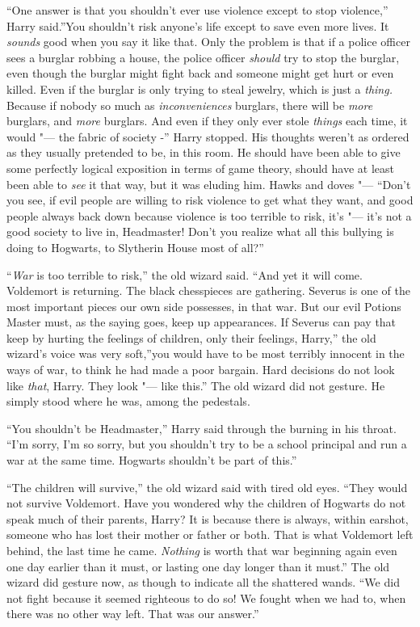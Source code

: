 ``One answer is that you shouldn't ever use violence except to stop
violence,'' Harry said.''You shouldn't risk anyone's life except to save
even more lives. It \emph{sounds} good when you say it like that. Only
the problem is that if a police officer sees a burglar robbing a house,
the police officer \emph{should} try to stop the burglar, even though
the burglar might fight back and someone might get hurt or even killed.
Even if the burglar is only trying to steal jewelry, which is just a
\emph{thing.} Because if nobody so much as \emph{inconveniences}
burglars, there will be \emph{more} burglars, and \emph{more} burglars.
And even if they only ever stole \emph{things} each time, it would "--- the
fabric of society -'' Harry stopped. His thoughts weren't as ordered as
they usually pretended to be, in this room. He should have been able to
give some perfectly logical exposition in terms of game theory, should
have at least been able to \emph{see} it that way, but it was eluding
him. Hawks and doves "--- ``Don't you see, if evil people are willing to
risk violence to get what they want, and good people always back down
because violence is too terrible to risk, it's "--- it's not a good society
to live in, Headmaster! Don't you realize what all this bullying is
doing to Hogwarts, to Slytherin House most of all?''

``\emph{War} is too terrible to risk,'' the old wizard said. ``And yet it
will come. Voldemort is returning. The black chesspieces are gathering.
Severus is one of the most important pieces our own side possesses, in
that war. But our evil Potions Master must, as the saying goes, keep up
appearances. If Severus can pay that keep by hurting the feelings of
children, only their feelings, Harry,'' the old wizard's voice was very
soft,''you would have to be most terribly innocent in the ways of war,
to think he had made a poor bargain. Hard decisions do not look like
\emph{that}, Harry. They look "--- like this.'' The old wizard did not
gesture. He simply stood where he was, among the pedestals.

``You shouldn't be Headmaster,'' Harry said through the burning in his
throat. ``I'm sorry, I'm so sorry, but you shouldn't try to be a school
principal and run a war at the same time. Hogwarts shouldn't be part of
this.''

``The children will survive,'' the old wizard said with tired old eyes.
``They would not survive Voldemort. Have you wondered why the children of
Hogwarts do not speak much of their parents, Harry? It is because there
is always, within earshot, someone who has lost their mother or father
or both. That is what Voldemort left behind, the last time he came.
\emph{Nothing} is worth that war beginning again even one day earlier
than it must, or lasting one day longer than it must.'' The old wizard
did gesture now, as though to indicate all the shattered wands. ``We did
not fight because it seemed righteous to do so! We fought when we had
to, when there was no other way left. That was our answer.''

